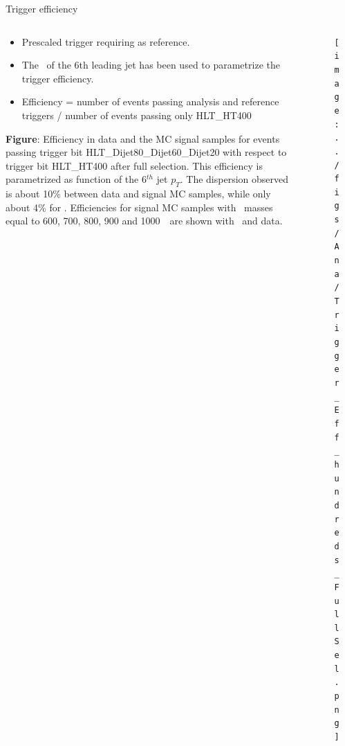 \begin{frame}{Trigger efficiency}
\vspace{-.2cm}

\begin{columns}
\begin{column}{.50\textwidth}
   \begin{block}{}\scriptsize
     \begin{itemize}
     \item Prescaled trigger requiring  as reference.
     \item The \pt~of the 6th leading jet has been used to parametrize the trigger efficiency.
     \item Efficiency = number of events passing analysis and reference triggers / number of events passing only HLT\_HT400
     \end{itemize}
    \end{block}

\vspace{-.2cm}
    \begin{block}{}\tiny
      \textbf{Figure}: Efficiency in data and the MC signal samples for events passing trigger bit HLT\_Dijet80\_Dijet60\_Dijet20 with respect to trigger bit HLT\_HT400 after full selection. This efficiency is parametrized as function of the 6$^{th}$ jet $p_{T}$. The dispersion observed is about 10\% between data and signal MC samples, while only about 4\%  for \ttbar. Efficiencies for signal MC samples with \Tp~masses equal to 600, 700, 800, 900 and 1000~\GeVcc~are shown with \ttbar~and data.
    \end{block}
\end{column}

\begin{column}{.50\textwidth}
\begin{figure}[!Hhtbp]
  \begin{center}
    \texttt{[image: ../figs/Ana/Trigger\_Eff\_hundreds\_FullSel.png]}
    \label{fig:TrigEffPostMH}
  \end{center}
\end{figure}
\end{column}

\end{columns}

\end{frame}

